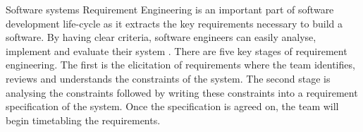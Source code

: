 \documentclass{article}
\begin{document}
	 Software systems Requirement Engineering is an important part of software development life-cycle as it extracts the key requirements necessary to build a software. 
	 By having clear criteria, software engineers can easily analyse, implement and evaluate their system \cite{nuseibeh2000requirements}. 
	 There are five key stages of requirement engineering. The first is the elicitation of requirements where the team identifies, reviews and understands the constraints of the system. 
	 The second stage is analysing the constraints followed by writing these constraints into a requirement specification of the system. 
	 Once the specification is agreed on, the team will begin timetabling the requirements. 
	 
%	 	
%	 
%	 	 
%	 
\end{document}
